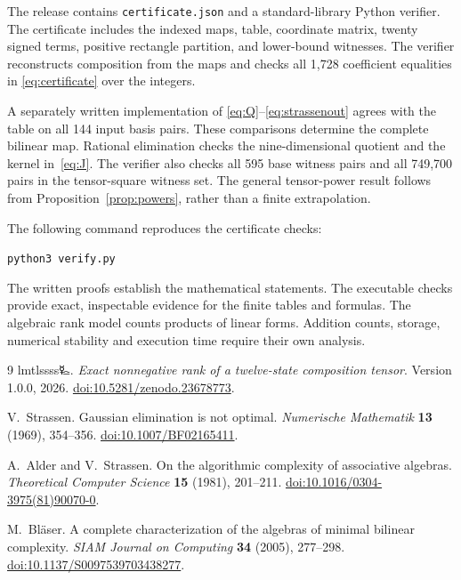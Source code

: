 \documentclass[11pt,a4paper]{article}
\begin{document}
The release contains \texttt{certificate.json} and a standard-library
Python verifier. The certificate includes the indexed maps, table,
coordinate matrix, twenty signed terms, positive rectangle partition,
and lower-bound witnesses. The verifier reconstructs composition from
the maps and checks all 1,728 coefficient equalities in
\eqref{eq:certificate} over the integers.

A separately written implementation of
\eqref{eq:Q}--\eqref{eq:strassenout} agrees with the table on all
144 input basis pairs. These comparisons determine the complete
bilinear map. Rational elimination checks the nine-dimensional quotient
and the kernel in~\eqref{eq:J}. The verifier also checks all 595 base
witness pairs and all 749,700 pairs in the tensor-square witness set.
The general tensor-power result follows from
Proposition~\ref{prop:powers}, rather than a finite extrapolation.

The following command reproduces the certificate checks:
\begin{center}\texttt{python3 verify.py}\end{center}
The written proofs establish the mathematical statements. The executable
checks provide exact, inspectable evidence for the finite tables and
formulas. The algebraic rank model counts products of linear forms.
Addition counts, storage, numerical stability and execution time require
their own analysis.

\begin{thebibliography}{9}
lmtlssss{\authorsymbol 🜐}.
\emph{Exact nonnegative rank of a twelve-state composition tensor}.
Version 1.0.0, 2026.
\href{https://doi.org/10.5281/zenodo.23678773}{doi:10.5281/zenodo.23678773}.

V.~Strassen.
Gaussian elimination is not optimal.
\emph{Numerische Mathematik} \textbf{13} (1969), 354--356.
\href{https://doi.org/10.1007/BF02165411}{doi:10.1007/BF02165411}.

A.~Alder and V.~Strassen.
On the algorithmic complexity of associative algebras.
\emph{Theoretical Computer Science} \textbf{15} (1981), 201--211.
\href{https://doi.org/10.1016/0304-3975(81)90070-0}{doi:10.1016/0304-3975(81)90070-0}.

M.~Bl\"aser.
A complete characterization of the algebras of minimal bilinear complexity.
\emph{SIAM Journal on Computing} \textbf{34} (2005), 277--298.
\href{https://doi.org/10.1137/S0097539703438277}{doi:10.1137/S0097539703438277}.
\end{thebibliography}
\end{document}
